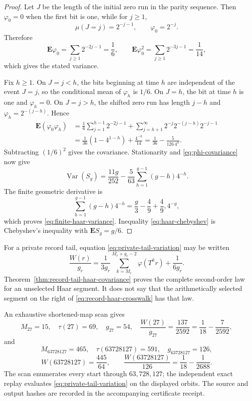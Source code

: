 \begin{proof}
Let $J$ be the length of the initial zero run in the parity sequence.  Then
$\varphi_0=0$ when the first bit is one, while for $j\ge1$,
\[
 \mu(J=j)=2^{-j-1},\qquad \varphi_0=2^{-j}.
\]
Therefore
\[
 \mathbf E\varphi_0
 =\sum_{j\ge1}2^{-2j-1}=\frac16,
 \qquad
 \mathbf E\varphi_0^2
 =\sum_{j\ge1}2^{-3j-1}=\frac1{14},
\]
which gives the stated variance.

Fix $h\ge1$.  On $J=j<h$, the bits beginning at time $h$ are independent
of the event $J=j$, so the conditional mean of $\varphi_h$ is $1/6$.  On
$J=h$, the bit at time $h$ is one and $\varphi_h=0$.  On $J=j>h$, the
shifted zero run has length $j-h$ and $\varphi_h=2^{-(j-h)}$.  Hence
\begin{align*}
 \mathbf E(\varphi_0\varphi_h)
 &=\frac16\sum_{j=1}^{h-1}2^{-2j-1}
   +\sum_{j=h+1}^{\infty}2^{-j}2^{-(j-h)}2^{-j-1}\\
 &=\frac1{36}(1-4^{1-h})+\frac{4^{-h}}{14}
  =\frac1{36}-\frac5{126\,4^h}.
\end{align*}
Subtracting $(1/6)^2$ gives the covariance.  Stationarity and
\eqref{eq:phi-covariance} now give
\[
 \operatorname{Var}(S_g)
 =\frac{11g}{252}-\frac5{63}
   \sum_{h=1}^{g-1}(g-h)4^{-h}.
\]
The finite geometric derivative is
\[
 \sum_{h=1}^{g-1}(g-h)4^{-h}
 =\frac g3-\frac49+\frac49,4^{-g},
\]
which proves \eqref{eq:finite-haar-variance}.  Inequality
\eqref{eq:haar-chebyshev} is Chebyshev's inequality with
$\mathbf E S_g=g/6$.
\end{proof}

For a private record tail, equation
\eqref{eq:private-tail-variation} may be written
\begin{equation}
 \frac{W(r)}{g_r}
 =\frac1{3g_r}\sum_{k=M_r}^{M_r+g_r-2}\varphi(T^kr)
  +\frac1{6g_r}.
 \label{eq:record-haar-crosswalk}
\end{equation}
Theorem~\ref{thm:record-tail-haar-covariance} proves the complete second-order
law for an unselected Haar segment.  It does not say that the arithmetically
selected segment on the right of \eqref{eq:record-haar-crosswalk} has that
law.

\begin{certificate}
\label{cert:record-tail-examples}
An exhaustive shortened-map scan gives
\[
 M_{27}=15,\quad \tau(27)=69,\quad g_{27}=54,
 \quad
 \frac{W(27)}{g_{27}}=\frac{137}{2592}
 =\frac1{18}-\frac7{2592},
\]
and
\[
 M_{63728127}=465,\quad \tau(63728127)=591,\quad g_{63728127}=126,
\]
\[
 W(63728127)=\frac{445}{64},\qquad
 \frac{W(63728127)}{126}
 =\frac1{18}-\frac1{2688}.
\]
The scan enumerates every start through $63{,}728{,}127$; the independent
exact replay evaluates \eqref{eq:private-tail-variation} on the displayed
orbits.  The source and output hashes are recorded in the accompanying
certificate receipt.
\end{certificate}

